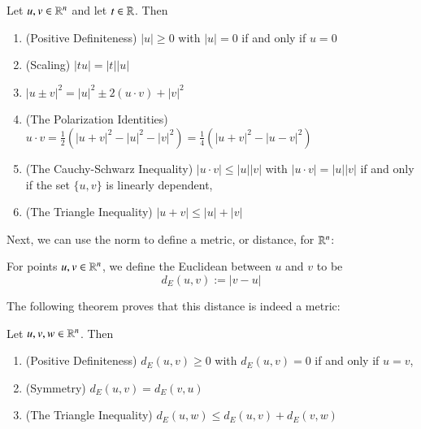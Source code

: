 \documentclass[12pt, a4paper, oneside, openright, titlepage]{book}
\begin{document}
\begin{thm}
    Let $u,v \in \mathbb R^n$ and let $t \in \mathbb R$. Then \begin{enumerate}
        \item (Positive Definiteness) $|u| \geq 0$ with $|u| = 0$ if and only if $u = 0$
        \item (Scaling) $|tu| = |t||u|$
        \item $|u\pm v|^2 = |u|^2\pm 2(u\cdot v)+|v|^2$ 
        \item (The Polarization Identities) $u\cdot v = \frac{1}{2}(|u+v|^2-|u|^2-|v|^2) = \frac{1}{4}(|u+v|^2-|u-v|^2)$
        \item (The Cauchy-Schwarz Inequality) $|u\cdot v| \leq |u||v|$ with $|u\cdot v| = |u||v|$ if and only if the set $\{u,v\}$ is linearly dependent,
        \item (The Triangle Inequality) $|u+v| \leq |u|+|v|$
    \end{enumerate}
\end{thm}

Next, we can use the norm to define a metric, or distance, for $\mathbb R^n$:

\begin{defn}
    For points $u,v \in \mathbb R^n$, we define the Euclidean  between $u$ and $v$ to be \begin{equation*}
        d_E(u,v) := |v-u|
    \end{equation*}
\end{defn}

The following theorem proves that this distance is indeed a metric:

\begin{thm}
    Let $u,v,w \in \mathbb R^n$. Then \begin{enumerate}
        \item (Positive Definiteness) $d_E(u,v) \geq 0$ with $d_E(u,v) = 0$ if and only if $u = v$,
        \item (Symmetry) $d_E(u,v) = d_E(v,u)$ 
        \item (The Triangle Inequality) $d_E(u,w) \leq d_E(u,v) + d_E(v,w)$
    \end{enumerate}
\end{thm}







\begin{appendices}


\end{appendices}
\end{document}
